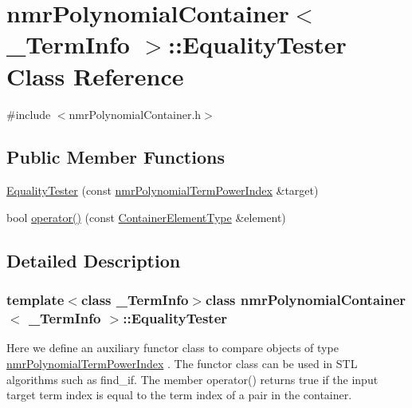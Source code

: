 \hypertarget{classnmr_polynomial_container_1_1_equality_tester}{\section{nmr\-Polynomial\-Container$<$ \-\_\-\-Term\-Info $>$\-:\-:Equality\-Tester Class Reference}
\label{classnmr_polynomial_container_1_1_equality_tester}
}


{\ttfamily \#include $<$nmr\-Polynomial\-Container.\-h$>$}

\subsection*{Public Member Functions}
\begin{DoxyCompactItemize}
\item 
\hyperlink{classnmr_polynomial_container_1_1_equality_tester_a6f0233ad0d5f5e2fde0c69ed369ff42a}{Equality\-Tester} (const \hyperlink{classnmr_polynomial_term_power_index}{nmr\-Polynomial\-Term\-Power\-Index} \&target)
\item 
bool \hyperlink{classnmr_polynomial_container_1_1_equality_tester_a97c80879184f550aff13be8b76734748}{operator()} (const \hyperlink{classnmr_polynomial_container_ae9c399b9034fb32315a644ebb103b4dd}{Container\-Element\-Type} \&element)
\end{DoxyCompactItemize}


\subsection{Detailed Description}
\subsubsection*{template$<$class \-\_\-\-Term\-Info$>$class nmr\-Polynomial\-Container$<$ \-\_\-\-Term\-Info $>$\-::\-Equality\-Tester}

Here we define an auxiliary functor class to compare objects of type \hyperlink{classnmr_polynomial_term_power_index}{nmr\-Polynomial\-Term\-Power\-Index} . The functor class can be used in S\-T\-L algorithms such as find\-\_\-if. The member operator() returns true if the input target term index is equal to the term index of a pair in the container. 

